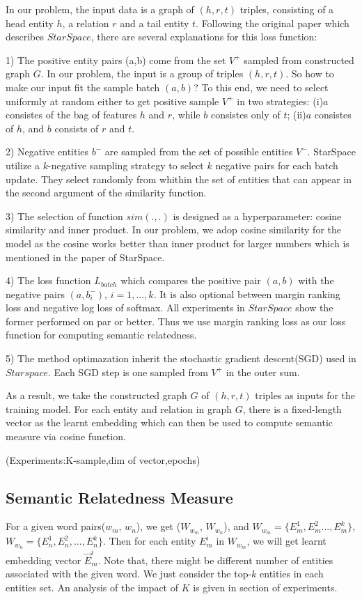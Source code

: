 In our problem, the input data is a graph of $(h, r, t)$ triples, consisting of a head entity $h$, 
a relation $r$ and a tail entity $t$.
Following the original paper which describes $StarSpace$, there are several explanations for this loss function:

1) The positive entity pairs (a,b) come from the set $V^+$ sampled from constructed graph $G$. 
In our problem, the input is a group of triples $(h, r, t)$. So how to make our input fit
the sample batch $(a, b)$? To this end, we need to select uniformly at random either to
get positive sample $V^+$ in two strategies:
(i)$a$ consistes of the bag of features $h$ and $r$, while $b$ consistes only of $t$; 
(ii)$a$ consistes of $h$, and $b$ consists of $r$ and $t$. 

2) Negative entities $b^-$ are sampled from the set of possible entities $V^-$.  
StarSpace utilize a $k$-negative sampling strategy\cite{corr/Mikolov13} to select $k$ negative pairs for each batch update. 
They select randomly from whithin the set of entities that can appear in the second argument of the similarity function.

3) The selection of function $sim(.,.)$ is designed as a hyperparameter: cosine similarity and inner product.
In our problem, we adop cosine similarity for the model as the cosine works better than inner product for
larger numbers which is mentioned in the paper of StarSpace.

4) The loss function $L_{batch}$ which compares the positive pair $(a,b)$ with the negative pairs $(a, b_i^-)$, $i=1,...,k$.
It is also optional between margin ranking loss and negative log loss of softmax. All experiments in $StarSpace$ show
the former performed on par or better. Thus we use margin ranking loss as our loss function for computing semantic relatedness.

5) The method optimazation inherit the stochastic gradient descent(SGD) used in $Starspace$. Each SGD step is one
sampled from $V^+$ in the outer sum.

As a result, we take the constructed graph $G$ of $(h, r, t)$ triples as inputs for the training model.
For each entity and relation in graph $G$, there is a fixed-length vector as the learnt embedding which
can then be used to compute semantic measure via cosine function.

(Experiments:K-sample,dim of vector,epochs)


\subsection{Semantic Relatedness Measure}
\label{sec:measure}
For a given word pairs($w_m$, $w_n$), we get ($W_{w_m}$, $W_{w_n}$), and $W_{w_m}=\{E_m^1,E_m^2...,E_m^k\}$,
$W_{w_n}=\{E_n^1,E_n^2,...,E_n^k\}$. Then for each entity $E_m^i$ in $W_{w_m}$, we will get learnt embedding vector
$\overrightarrow E_m^i$.
Note that, there might be different number of entities associated with the given
word. We just consider the top-$k$ entities in each entities set. An analysis of the impact of $K$ is
given in section of experiments.

